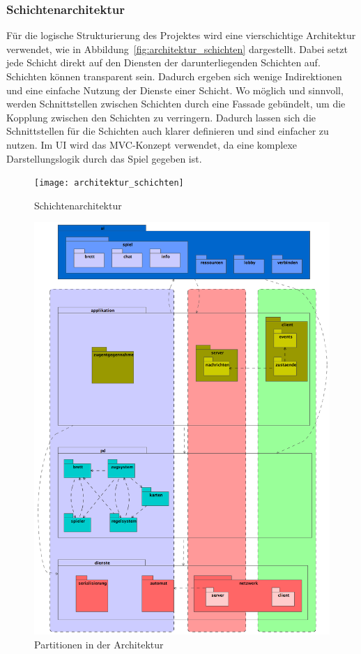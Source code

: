 \documentclass[12pt,halfparskip]{scrartcl}
\begin{document}
\subsubsection{Schichtenarchitektur}
\label{sub:schichtenarchitektur}
Für die logische Strukturierung des Projektes wird eine vierschichtige Architektur verwendet, wie in Abbildung~\vref{fig:architektur_schichten} dargestellt. Dabei setzt jede Schicht direkt auf den Diensten der darunterliegenden Schichten auf. Schichten können transparent sein. Dadurch ergeben sich wenige Indirektionen und eine einfache Nutzung der Dienste einer Schicht. Wo möglich und sinnvoll, werden Schnittstellen zwischen Schichten durch eine Fassade gebündelt, um die Kopplung zwischen den Schichten zu verringern. Dadurch lassen sich die Schnittstellen für die Schichten auch klarer definieren und sind einfacher zu nutzen. Im UI wird das MVC-Konzept verwendet, da eine komplexe Darstellungslogik durch das Spiel gegeben ist.
\begin{figure}
	\centering
	\texttt{[image: architektur\_schichten]}
	\caption{Schichtenarchitektur}
	\label{fig:architektur_schichten}
\end{figure}
\clearpage
\begin{figure}
	\centering
	\includegraphics[height=\textheight]{architektur_partitions}
	\caption{Partitionen in der Architektur}
	\label{fig:architektur_partitions}
\end{figure}
\end{document}
